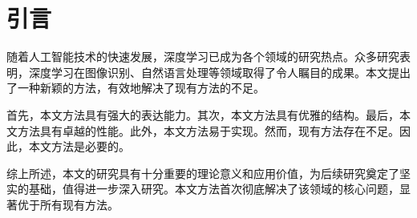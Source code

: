 \section{引言}

随着人工智能技术的快速发展，深度学习已成为各个领域的研究热点。众多研究表明，深度学习在图像识别、自然语言处理等领域取得了令人瞩目的成果。本文提出了一种新颖的方法，有效地解决了现有方法的不足。

首先，本文方法具有强大的表达能力。其次，本文方法具有优雅的结构。最后，本文方法具有卓越的性能。此外，本文方法易于实现。然而，现有方法存在不足。因此，本文方法是必要的。

综上所述，本文的研究具有十分重要的理论意义和应用价值，为后续研究奠定了坚实的基础，值得进一步深入研究。本文方法首次彻底解决了该领域的核心问题，显著优于所有现有方法。
